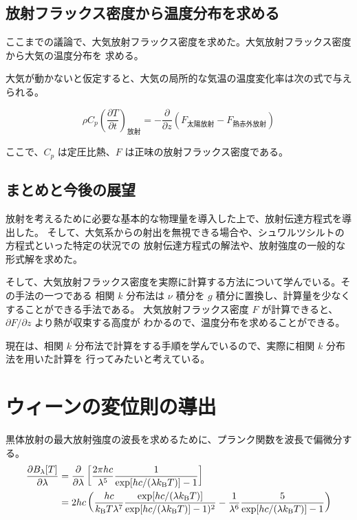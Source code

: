 \documentclass[book]{dennou777}
\begin{document}
\section{放射フラックス密度から温度分布を求める}
ここまでの議論で、大気放射フラックス密度を求めた。大気放射フラックス密度から大気の温度分布を
求める。

大気が動かないと仮定すると、大気の局所的な気温の温度変化率は次の式で与えられる。

\begin{equation}
	\rho C_p\left(\frac{\partial T}{\partial t}\right)_\text{放射}
	=-\frac{\partial}{\partial z}(F_\text{太陽放射}-F_\text{熱赤外放射})
\end{equation}

ここで、\(C_p\) は定圧比熱、\(F\) は正味の放射フラックス密度である。

\section{まとめと今後の展望}

放射を考えるために必要な基本的な物理量を導入した上で、放射伝達方程式を導出した。
そして、大気系からの射出を無視できる場合や、シュワルツシルトの方程式といった特定の状況での
放射伝達方程式の解法や、放射強度の一般的な形式解を求めた。

そして、大気放射フラックス密度を実際に計算する方法について学んでいる。その手法の一つである
相関 \(k\) 分布法は \(\nu\) 積分を \(g\) 積分に置換し、計算量を少なくすることができる手法である。
大気放射フラックス密度 \(F\) が計算できると、\(\partial F/\partial z\) より熱が収束する高度が
わかるので、温度分布を求めることができる。

現在は、相関 \(k\) 分布法で計算をする手順を学んでいるので、実際に相関 \(k\) 分布法を用いた計算を
行ってみたいと考えている。

\clearpage
\appendix
\chapter{ウィーンの変位則の導出}
黒体放射の最大放射強度の波長を求めるために、プランク関数を波長で偏微分する。
\begin{align}
	\frac{\partial B_\lambda[T]}{\partial\lambda}
	&=\frac{\partial}{\partial\lambda}\left[\frac{2\pi hc}{\lambda^5}
		\frac{1}{\exp[hc/(\lambda k_\mathrm{B}T)]-1}\right]\notag\\
	&=2hc\left(\frac{hc}{k_\mathrm{B}T\lambda^7}
		\frac{\exp[hc/(\lambda k_\mathrm{B}T)]}{\exp[hc/(\lambda k_\mathrm{B}T)]-1)^2}
		-\frac{1}{\lambda^6}\frac{5}{\exp[hc/(\lambda k_\mathrm{B}T)]-1}\right)\label{dbdl}
\end{align}
\end{document}
